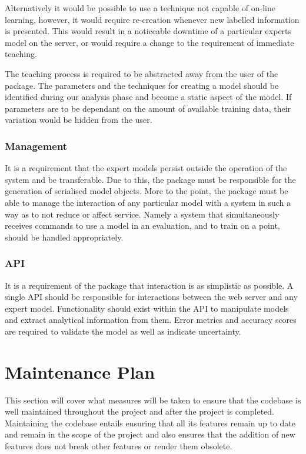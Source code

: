 \documentclass{ecmm427_assignment}
\begin{document}
 Alternatively it would be possible to use a technique not capable of on-line learning, however, it would require re-creation whenever new labelled information is presented. This would result in a noticeable downtime of a particular experts model on the server, or would require a change to the requirement of immediate teaching.

 The teaching process is required to be abstracted away from the user of the package. The parameters and the techniques for creating a model should be identified during our analysis phase and become a static aspect of the model. If parameters are to be dependant on the amount of available training data, their variation would be hidden from the user.

\subsubsection{Management}

 It is a requirement that the expert models persist outside the operation of the system and be transferable. Due to this, the package must be responsible for the generation of serialised model objects. More to the point, the package must be able to manage the interaction of any particular model with a system in such a way as to not reduce or affect service. Namely a system that simultaneously receives commands to use a model in an evaluation, and to train on a point, should be handled appropriately.

\subsubsection{API}

 It is a requirement of the package that interaction is as simplistic as possible. A single API should be responsible for interactions between the web server and any expert model. Functionality should exist within the API to manipulate models and extract analytical information from them. Error metrics and accuracy scores are required to validate the model as well as indicate uncertainty.

\section{Maintenance Plan}
 This section will cover what measures will be taken to ensure that the codebase is well maintained throughout the project and after the project is completed. Maintaining the codebase entails ensuring that all its features remain up to date and remain in the scope of the project and also ensures that the addition of new features does not break other features or render them obsolete.
\end{document}

